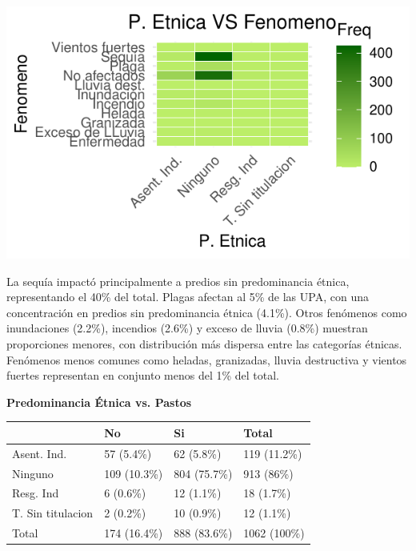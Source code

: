 \documentclass[]{tufte-handout}
\begin{document}
\begin{marginfigure}
\includegraphics[width=1.3\linewidth]{Informe_files/figure-latex/heat2-1} \end{marginfigure}
\vspace{0.5 cm}

La sequía impactó principalmente a predios sin predominancia étnica,
representando el 40\% del total. Plagas afectan al 5\% de las UPA, con
una concentración en predios sin predominancia étnica (4.1\%). Otros
fenómenos como inundaciones (2.2\%), incendios (2.6\%) y exceso de
lluvia (0.8\%) muestran proporciones menores, con distribución más
dispersa entre las categorías étnicas. Fenómenos menos comunes como
heladas, granizadas, lluvia destructiva y vientos fuertes representan en
conjunto menos del 1\% del total.

\begin{center}
\textbf{Predominancia Étnica vs. Pastos}
\end{center}

\begin{tabular}{llll}
\toprule
  & No & Si & Total\\
\midrule
Asent. Ind. & 57 (5.4\%) & 62 (5.8\%) & 119 (11.2\%)\\
Ninguno & 109 (10.3\%) & 804 (75.7\%) & 913 (86\%)\\
Resg. Ind & 6 (0.6\%) & 12 (1.1\%) & 18 (1.7\%)\\
T. Sin titulacion & 2 (0.2\%) & 10 (0.9\%) & 12 (1.1\%)\\
Total & 174 (16.4\%) & 888 (83.6\%) & 1062 (100\%)\\
\bottomrule
\end{tabular}
\vspace{0.7cm}
\end{document}
